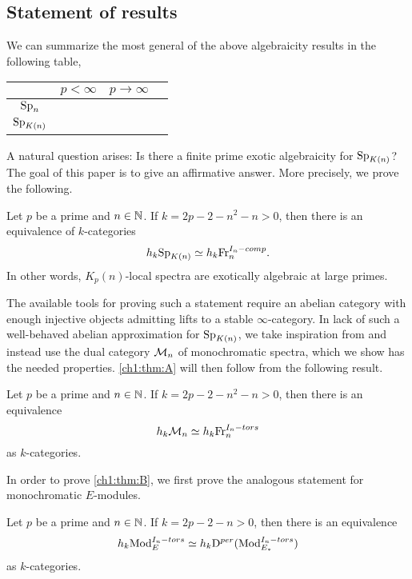 \subsection*{Statement of results}

We can summarize the most general of the above algebraicity results in the following table,
\begin{table}[h]
    \centering
    \begin{tabular}{c|ccc}
        & $p<\infty $ & $p\rightarrow \infty$ \\
        \hline 
        $\mathrm{Sp}_{n}$& \cite{patchkoria-pstragowski_2021} & \cite{barthel-schlank-stapleton_2020} \\
        $\mathrm{Sp}_{{K(n)}}$ &  & \cite{barthel-schlank-stapleton_2021} 
    \end{tabular}
\end{table}

A natural question arises: Is there a finite prime exotic algebraicity for $\mathrm{Sp}_{{K(n)}}$? The goal of this paper is to give an affirmative answer. More precisely, we prove the following. 

\begin{introthm}
    \label{ch1:thm:A}
    Let $p$ be a prime and $n\in \mathbb{N}$. If $k=2p-2-n^2-n>0$,  then there is an equivalence of $k$-categories 
    \[h_k \mathrm{Sp}_{{K(n)}}\simeq h_k \mathrm{Fr}_{n}^{I_n-comp}.\]
    In other words, $K_p(n)$-local spectra are exotically algebraic at large primes. 
\end{introthm}

The available tools for proving such a statement require an abelian category with enough injective objects admitting lifts to a stable $\infty$-category. In lack of such a well-behaved abelian approximation for $\mathrm{Sp}_{{K(n)}}$, we take inspiration from \cite{barthel-schlank-stapleton_2021} and instead use the dual category $\mathcal{M}_{n}$ of monochromatic spectra, which we show has the needed properties. \cref{ch1:thm:A} will then follow from the following result. 

\begin{introthm}
    \label{ch1:thm:B}
    Let $p$ be a prime and $n\in \mathbb{N}$. If $k=2p-2-n^2-n>0$,  then there is an equivalence 
    \[h_k \mathcal{M}_{n}\simeq h_k \mathrm{Fr}_{n}^{I_n-tors}\]
    as $k$-categories.
\end{introthm}

In order to prove \cref{ch1:thm:B}, we first prove the analogous statement for monochromatic $E$-modules. 
    
\begin{introthm}
    \label{ch1:thm:C}
    Let $p$ be a prime and $n\in \mathbb{N}$. If $k=2p-2-n>0$,  then there is an equivalence
    \[h_k \mathrm{Mod}_{E}^{I_n-tors}\simeq h_k \mathrm{D}^{per}(\mathrm{Mod}_{E_*}^{I_n-tors})\]
    as $k$-categories.
\end{introthm}


